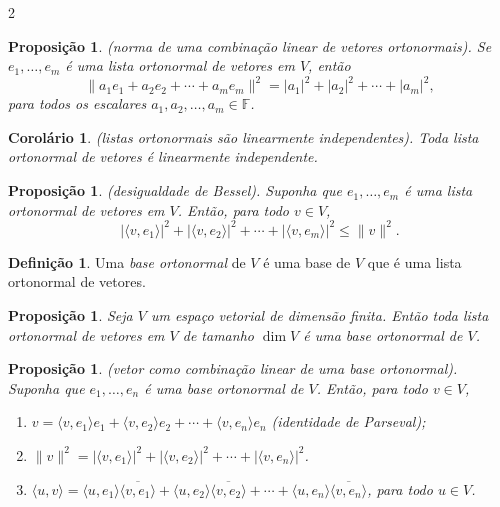 \documentclass{article}
\theoremstyle{plain}
\newtheorem{prop}[thm]{Proposição}
\newtheorem{cor}[thm]{Corolário}
\theoremstyle{definition}
\newtheorem{defn}{Definição}[section]
\theoremstyle{remark}
\begin{document}
\begin{multicols}{2}
\begin{prop} (norma de uma combinação linear de vetores ortonormais).
    Se \(e_1, \ldots, e_m\) é uma lista ortonormal de vetores em \(V\), então
    \begin{equation}
        \|a_1 e_1 + a_2 e_2 + \cdots + a_m e_m\|^2 = |a_1|^2 + |a_2|^2 + \cdots + |a_m|^2,
    \end{equation}
    \noindent para todos os escalares \(a_1, a_2, \ldots, a_m \in \mathbb{F}\).
\end{prop}

\begin{cor} (listas ortonormais são linearmente independentes).
    Toda lista ortonormal de vetores é linearmente independente.
\end{cor}

\begin{prop} (desigualdade de Bessel).
    Suponha que \(e_1, \ldots, e_m\) é uma lista ortonormal de vetores em \(V\). Então, para todo \(v \in V\),
    \begin{equation}
        |\langle v, e_1 \rangle|^2 + |\langle v, e_2 \rangle|^2 + \cdots + |\langle v, e_m \rangle|^2 \leq \|v\|^2.
    \end{equation}
\end{prop}

\begin{defn}
    Uma \emph{base ortonormal} de \(V\) é uma base de \(V\) que é uma lista ortonormal de vetores.
\end{defn}

\begin{prop}
    Seja \(V\) um espaço vetorial de dimensão finita. Então toda lista ortonormal de vetores em \(V\) de tamanho \(\dim V\) é uma base ortonormal de \(V\).
\end{prop}

\begin{prop} (vetor como combinação linear de uma base ortonormal).
    Suponha que \(e_1, \ldots, e_n\) é uma base ortonormal de \(V\). Então, para todo \(v \in V\),
    \begin{enumerate}
        \item [\textup{(a)}] \(v = \langle v, e_1 \rangle e_1 + \langle v, e_2 \rangle e_2 + \cdots + \langle v, e_n \rangle e_n\) (identidade de Parseval);
        \item [\textup{(b)}] \(\|v\|^2 = |\langle v, e_1 \rangle|^2 + |\langle v, e_2 \rangle|^2 + \cdots + |\langle v, e_n \rangle|^2\).
        \item [\textup{(c)}] \(\langle u, v \rangle = \langle u, e_1 \rangle \overline{\langle v, e_1 \rangle} + \langle u, e_2 \rangle \overline{\langle v, e_2 \rangle} + \cdots + \langle u, e_n \rangle \overline{\langle v, e_n \rangle}\), para todo \(u \in V\).
    \end{enumerate}
\end{prop}


\end{multicols}
\end{document}
